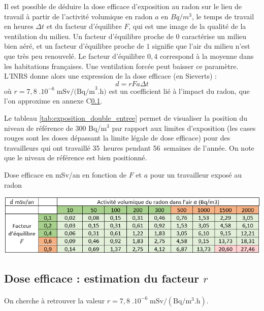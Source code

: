\documentclass{article}
\begin{document}
Il est possible de déduire la dose efficace d’exposition au radon sur le lieu de travail à partir de l’activité volumique en radon $a$ en $Bq/m^3$, le temps de travail en heures $\Delta t$ et du facteur d’équilibre $F$, qui est une image de la qualité de la ventilation du milieu. Un facteur d’équilibre proche de $0$ caractérise un milieu bien aéré, et un facteur d’équilibre proche de $1$ signifie que l’air du milieu n’est que très peu renouvelé. Le facteur d’équilibre $0,4$ correspond à la moyenne dans les habitations françaises. Une ventilation forcée peut baisser ce paramètre. L'INRS donne alors une expression \cite{blanchardon_evaluation_2019} de la dose efficace (en Sieverts) : $$
d = r F a \Delta t
$$
où $r=7,8 \; .10^{-6} \; \text{mSv/(Bq/m}^3\text{.h})$ est un coefficient lié à l’impact du radon, que l'on approxime en annexe C\ref{annexe:estimation_r}. %

Le tableau \ref{tab:exposition_double_entree} permet de visualiser la position du niveau de référence de 300 Bq/m$^3$ par rapport aux limites d’exposition (les cases rouges sont les doses dépassant la limite légale de dose efficace) pour des travailleurs qui ont travaillé 35~heures pendant 56~semaines de l’année. On note que le niveau de référence est bien positionné.

\begin{table}[H]
    \centering
    \caption{Dose efficace en mSv/an en fonction de $F$ et $a$ pour un travailleur exposé au radon}
    \includegraphics[width=\linewidth]{II_A2_6.png}
    \label{tab:exposition_double_entree}
\end{table}

\subsection{Dose efficace : estimation du facteur $r$}
\label{annexe:estimation_r}

\paragraph{} On cherche à retrouver la valeur $r=7,8 \; .10^{-6} \;\text{m}\text{Sv}/(\text{Bq}/\text{m}^3.\text{h})$.
\end{document}
